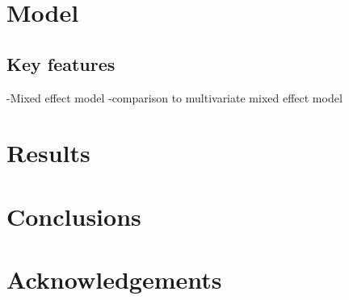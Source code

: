 \documentclass[11pt]{amsart}
\begin{document}
\section{Model}
\subsection{Key features}
-Mixed effect model
	-comparison to multivariate mixed effect model
	
\section{Results}

\section{Conclusions}

\section{Acknowledgements}




\end{document}
